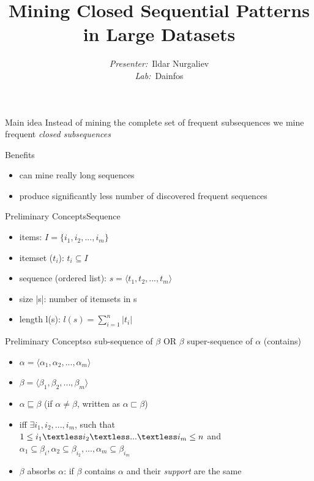 \documentclass[14pt]{beamer}
\title{\fontsize{15}{15}\selectfont
	\textbf{Mining Closed Sequential Patterns in Large Datasets
}}
\author{
	\fontvi
	\small{%
\emph{Presenter:}~Ildar Nurgaliev\\%
\emph{Lab:}~Dainfos}\\%
}
\date{}
\begin{document}
\maketitle

\begin{frame}{Main idea}
  Instead of mining the complete set of frequent subsequences we mine frequent \textit{closed subsequences}
\end{frame}

\begin{frame}{Benefits}
\begin{itemize}
\item can mine really long sequences
\item produce significantly less number of discovered frequent sequences
\end{itemize}
\end{frame}

\begin{frame}{Preliminary Concepts}{Sequence}
\begin{itemize}
\item items: $\textit{I} = \{i_1, i_2, ..., i_m\}$
\item itemset ($t_i$): $t_i \subseteq \textit{I}$
\item sequence (ordered list): $s = \langle t_1, t_2, ..., t_m \rangle$
\item size |s|: number of itemsets in s
\item length l(s): $l(s)=\sum\limits_{i=1}^n |t_i|$
\end{itemize}
\end{frame}

\begin{frame}{Preliminary Concepts}{$\alpha$ sub-sequence of $\beta$ OR $\beta$ super-sequence of $\alpha$ (contains)}
\begin{itemize}
\item $\alpha = \langle \alpha_1, \alpha_2, ..., \alpha_m \rangle$
\item $\beta = \langle \beta_1, \beta_2, ..., \beta_m \rangle$
\item $\alpha \sqsubseteq \beta$ (if $\alpha \neq \beta$, written as $\alpha \sqsubset \beta$)
\item iff $\exists i_1, i_2,...,i_m$, such that\\ $1 \leq i_1 \textless i_2 \textless ... \textless i_m \leq n$ and\\ $\alpha_1 \subseteq \beta_i,\alpha_2 \subseteq \beta_{i_2},...,\alpha_m \subseteq \beta_{i_m}$
\item $\beta$ absorbs $\alpha$: if $\beta$ contains $\alpha$ and their \textit{support} are the same
\end{itemize}
\end{frame}
\end{document}
